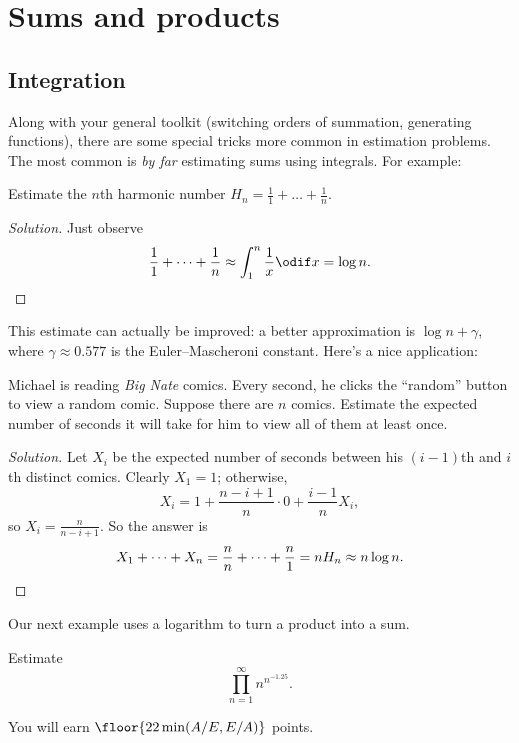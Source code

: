 \documentclass[11pt]{scrartcl}
\renewenvironment{solution}{\renewcommand\qedsymbol{$\blacksquare$}\begin{proof}[Solution]}{\end{proof}}
\begin{document}
\section{Sums and products}

\subsection{Integration}

Along with your general toolkit (switching orders of summation, generating functions), there are some special tricks more common in estimation problems. The most common is \emph{by far} estimating sums using integrals. For example:

\begin{example}
	Estimate the $n$th harmonic number $H_n = \frac11 + \dots + \frac1n$.
\end{example}

\begin{solution}
	Just observe
	\[\frac11 + \dots + \frac1n \approx \int_1^n\frac1x \odif x = \log n. \qedhere\]
\end{solution}

This estimate can actually be improved: a better approximation is $\log n + \gamma$, where $\gamma \approx 0.577$ is the Euler--Mascheroni constant. Here's a nice application:

\begin{example}
	Michael is reading \emph{Big Nate} comics. Every second, he clicks the ``random'' button to view a random comic. Suppose there are $n$ comics. Estimate the expected number of seconds it will take for him to view all of them at least once.
\end{example}

\begin{solution}
	Let $X_i$ be the expected number of seconds between his $(i - 1)$th and $i$th distinct comics. Clearly $X_1 = 1$; otherwise,
	\[X_i = 1 + \frac{n - i + 1}n \cdot 0 + \frac{i - 1}nX_i,\]
	so $X_i = \frac n{n - i + 1}$. So the answer is
	\[X_1 + \dots + X_n = \frac nn + \dots + \frac n1 = nH_n \approx n \log n. \qedhere\]
\end{solution}

Our next example uses a logarithm to turn a product into a sum.

\begin{example}
	Estimate
	\[\prod_{n = 1}^{\infty}n^{n^{-1.25}}.\]

	You will earn $\floor{22\min(A/E,E/A)}$ points.
\end{example}
\end{document}
